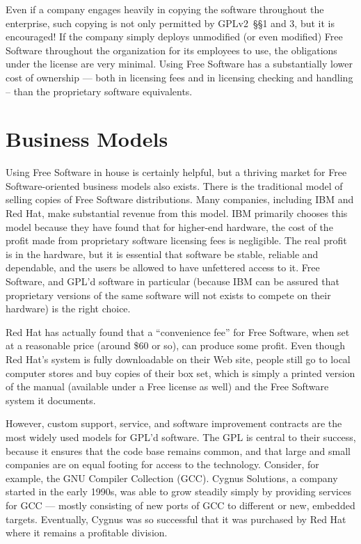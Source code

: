 Even if a company engages heavily in copying the software throughout the
enterprise, such copying is not only permitted by GPLv2~\S\S1 and 3, but it is
encouraged!  If the company simply deploys unmodified (or even modified)
Free Software throughout the organization for its employees to use, the
obligations under the license are very minimal. Using Free Software has a
substantially lower cost of ownership --- both in licensing fees and in
licensing checking and handling -- than the proprietary software
equivalents.

\section{Business Models}
\label{Business Models}

Using Free Software in house is certainly helpful, but a thriving
market for Free Software-oriented business models also exists. There is the
traditional model of selling copies of Free Software distributions.
Many companies, including IBM and Red Hat, make substantial revenue
from this model. IBM primarily chooses this model because they have
found that for higher-end hardware, the cost of the profit made from
proprietary software licensing fees is negligible. The real profit is
in the hardware, but it is essential that software be stable, reliable
and dependable, and the users be allowed to have unfettered access to
it. Free Software, and GPL'd software in particular (because IBM can
be assured that proprietary versions of the same software will not
exists to compete on their hardware) is the right choice.

Red Hat has actually found that a ``convenience fee'' for Free Software,
when set at a reasonable price (around \$60 or so), can produce some
profit. Even though Red Hat's system is fully downloadable on their
Web site, people still go to local computer stores and buy copies of their
box set, which is simply a printed version of the manual (available under
a Free license as well) and the Free Software system it documents.

\medskip

However, custom support, service, and software improvement contracts
are the most widely used models for GPL'd software. The GPL is
central to their success, because it ensures that the code base
remains common, and that large and small companies are on equal
footing for access to the technology. Consider, for example, the GNU
Compiler Collection (GCC). Cygnus Solutions, a company started in the
early 1990s, was able to grow steadily simply by providing services
for GCC --- mostly consisting of new ports of GCC to different or new,
embedded targets. Eventually, Cygnus was so successful that
it was purchased by Red Hat where it remains a profitable division.

